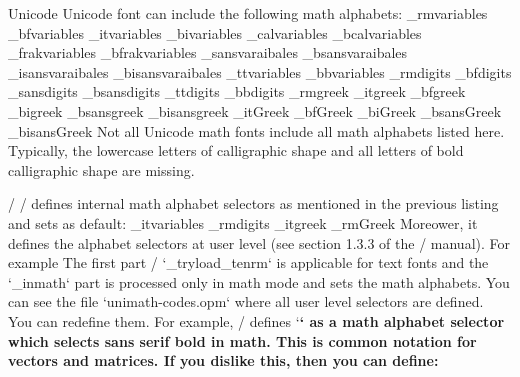 \new Unicode
Unicode font can include the following math alphabets:
\begtt \typosize[9/11]
\_rmvariables      %
\_bfvariables      %
\_itvariables      %
\_bivariables      %
\_calvariables     %
\_bcalvariables    %
\_frakvariables    %
\_bfrakvariables   %
\_sansvaraibales   %
\_bsansvaraibales  %
\_isansvaraibales  %
\_bisansvaraibales %
\_ttvariables      %
\_bbvariables      %
\_rmdigits         %
\_bfdigits         %
\_sansdigits       %
\_bsansdigits      %
\_ttdigits         %
\_bbdigits         %
\_rmgreek          %
\_itgreek          %
\_bfgreek          %
\_bigreek          %
\_bsansgreek       %
\_bisansgreek      %
\_itGreek          %
\_bfGreek          %
\_biGreek          %
\_bsansGreek       %
\_bisansGreek      %
\endtt
%
Not all Unicode math fonts include all math alphabets listed here. Typically, 
the lowercase letters of calligraphic shape and all letters of
bold calligraphic shape are missing.

\new \OpTeX/
\OpTeX/ defines internal math alphabet selectors as mentioned in the
previous listing and sets as default:
\begtt \typosize[10/12]
\_itvariables \_rmdigits \_itgreek \_rmGreek
\endtt
%
Moreower, it defines the alphabet selectors at user level (see section 1.3.3
of the \OpTeX/ manual). For example
\begtt \typosize[10/12]
\def\rm {\_tryload\_tenrm \_inmath{\_rmavariables \_rmdigits}}
\endtt
%
The first part 
\new \OpTeX/
`\_tryload\_tenrm` is applicable for text fonts and the 
`\_inmath` part is processed only in math mode and sets the math alphabets.
You can see the file `unimath-codes.opm` where all user level selectors are
defined. You can redefine them. For example, \OpTeX/ defines `\bf` as a math
alphabet selector which selects sans serif bold in math. This is common
notation for vectors and matrices. If you dislike this, then you can define:
\begtt \typosize[10/12]
\def\bf {\_tryloadbf\_tenbf \_inmath{\_bfvariables\_bfdigits\_bfgreek\_bfGreek}}
\endtt


